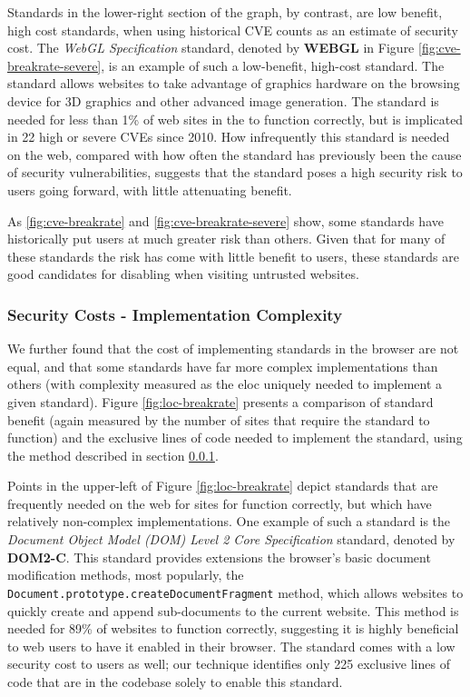 Standards in the lower-right section of the graph, by contrast, are low benefit,
high cost standards, when using historical CVE counts as an estimate of security
cost.   The \textit{WebGL Specification} standard, denoted by \textbf{WEBGL}
in Figure \ref{fig:cve-breakrate-severe}, is an example of such a low-benefit,
high-cost standard.  The standard allows websites to take advantage of graphics
hardware on the browsing device for 3D graphics and other advanced image
generation.  The standard is needed for less than 1\% of web sites
in the \ATK to function correctly, but is implicated in 22 high or severe CVEs since
2010.  How infrequently this standard is needed on the web, compared with
how often the standard has previously been the cause of security
vulnerabilities, suggests that the standard poses a high security
risk to users going forward, with little attenuating benefit.

As \ref{fig:cve-breakrate} and \ref{fig:cve-breakrate-severe} show, some standards have historically
put users at much greater risk than others.  Given that for many of these
standards the risk has come with little benefit to users, these standards
are good candidates for disabling when visiting untrusted websites.


\subsubsection{Security Costs - Implementation Complexity}
\label{cost-benefit:results:costs-loc}



We further found that the cost of implementing standards in the browser are
not equal, and that some standards have far more complex implementations than
others (with complexity measured as the \gls{eloc} uniquely needed to
implement a given standard). Figure \ref{fig:loc-breakrate} presents a
comparison of standard benefit (again measured by the number of sites that
require the standard to function) and the exclusive lines of code needed to implement the standard, using the method
described in section \ref{cost-benefit:results:costs-loc}.

Points in the upper-left of Figure \ref{fig:loc-breakrate} depict standards
that are frequently needed on the web for sites for function correctly,
but which have relatively non-complex implementations.  One example of
such a standard is the \textit{Document Object Model (DOM) Level 2 Core
Specification} standard, denoted by \textbf{DOM2-C}.  This standard
provides extensions the browser's basic document modification methods,
most popularly, the \texttt{Document.prototype.createDocumentFragment}
method, which allows websites to quickly create and append sub-documents
to the current website.  This method is needed for 89\% of websites to
function correctly, suggesting it is highly beneficial to web users to have it
enabled in their browser.  The standard comes with a low security cost to users as well;
our technique identifies only 225 exclusive lines of code that are in
the codebase solely to enable this standard.

